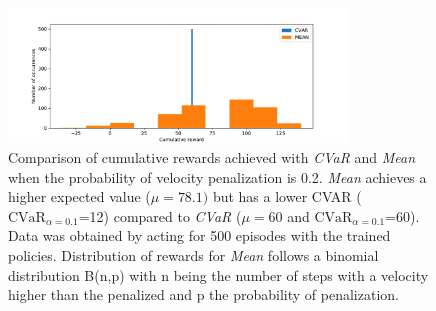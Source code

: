 \begin{figure}[ht]
        \centering
        \includegraphics[width=0.8\textwidth]{images/Car/histogram_rewards1vs01.pdf}
        \caption{Comparison of cumulative rewards achieved with \textit{CVaR} and \textit{Mean}
        when the probability of velocity penalization is 0.2.
        \textit{Mean} achieves a higher expected value  ($\mu=78.1)$  but 
        has a lower CVAR ($\text{CVaR}_{\alpha= 0.1}$=12) compared to
        \textit{CVaR} ($\mu=60$ and $\text{CVaR}_{\alpha= 0.1}$=60).
        Data was obtained by acting for 500 episodes with the trained policies.
        Distribution of rewards for \textit{Mean} follows a binomial distribution B(n,p)
        with n being the number of steps with a velocity higher than the penalized and 
        p the probability of penalization.}
        \label{fig:histogram_cvar_vs_mean}
    
\end{figure}


